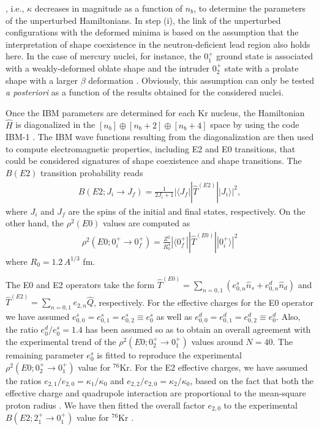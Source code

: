 \documentclass[twocolumn,showpacs,amsmath,amssymb,superscriptaddress]{revtex4-1}
\begin{document}
\cite{OAI,nomura2008}, i.e., $\kappa$ decreases in magnitude as a
function of $n_b$, to determine  the parameters of the 
unperturbed Hamiltonians. In  step (i), the link of the unperturbed configurations with
the deformed minima is based on the assumption that the
interpretation of shape coexistence in the
neutron-deficient lead region 
\cite{bengtsson1987,bengtsson1989,nazarewicz1993} also holds here. 
In the case of mercury nuclei, for
instance, the $0^+_1$ ground state is associated with a weakly-deformed
oblate shape and the intruder $0^+_2$ state with a prolate shape with a
larger $\beta$ deformation \cite{bengtsson1987,nazarewicz1993}. 
Obviously, this
assumption can only be tested {\it{a posteriori}} as a function
of the results obtained for the considered nuclei. 


Once the IBM parameters are determined for each Kr nucleus, the
Hamiltonian $\hat H$ is diagonalized in the 
$[n_b]\oplus [n_b+2]\oplus [n_b+4]$ space by using the code IBM-1
\cite{IBM1}. The IBM wave functions resulting from the diagonalization
are then used to compute electromagnetic properties, including E2 and E0
transitions, that could be considered signatures of shape coexistence
and shape transitions. The $B(E2)$ transition probability reads
\begin{eqnarray}
 B(E2; J_i\rightarrow J_f)=\frac{1}{2J_i+1}|\langle J_f||\hat T^{(E2)}||J_i\rangle|^2, 
\end{eqnarray}
where $J_i$ and $J_f$ are the spins of the initial and final states,
respectively.  On the other hand, the  $\rho^2({E0})$ values are computed
as 
\begin{eqnarray}
\label{eq:rhoe0}
 \rho^2(E0; 0^+_i\rightarrow 0^+_f) = \frac{Z^2}{R_0^4}|\langle 0^+_f||\hat T^{(E0)}||0^+_i\rangle|^2
\end{eqnarray}
where $R_0=1.2\,A^{1/3}$ fm. 

The E0 and E2 operators take the form 
$\hat T^{(E0)}=\sum_{n=0,1}(e_{0,n}^s\hat n_s + e_{0,n}^d\hat n_d)$ and 
$\hat T^{(E2)}=\sum_{n=0,1}e_{2,n}\hat Q$, respectively. 
For the  effective charges for the E0 operator we have assumed
$e_{0,0}^s=e_{0,1}^s=e_{0,2}^s\equiv e_{0}^s$ as well as 
$e_{0,0}^d=e_{0,1}^d=e_{0,2}^d\equiv e_{0}^d$. 
Also, the ratio $e_{0}^d/e_{0}^s=1.4$ has been assumed so as to obtain an overall
agreement with the  experimental trend of the
$\rho^2(E0; 0^+_2\rightarrow 0^+_1)$ values around $N=40$. 
The remaining parameter $e_0^s$ is fitted to reproduce the experimental
$\rho^2(E0; 0^+_2\rightarrow 0^+_1)$ value for  
$^{76}$Kr. For the E2 effective charges, we have assumed  the ratios 
$e_{2,1}/e_{2,0}=\kappa_{1}/\kappa_{0}$ and
$e_{2,2}/e_{2,0}=\kappa_{2}/\kappa_{0}$, based on the fact that both the 
effective charge and quadrupole interaction are proportional to the mean-square proton
radius \cite{duval1981,duval1982}. We have then fitted the overall
factor $e_{2,0}$ to the experimental $B(E2; 2^+_1\rightarrow 0^+_1)$
value  for $^{76}$Kr \cite{data}. 
\end{document}
